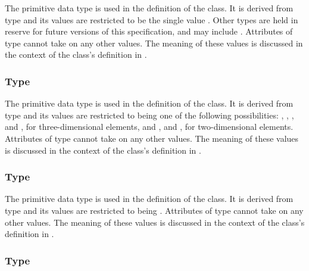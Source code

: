 The  primitive data type is used in the definition of the \ParametricObject class.  It is derived from type  and its values are restricted to be the single value .  Other  types are held in reserve for future versions of this specification, and may include . Attributes of type  cannot take on any other values.  The meaning of these values is discussed in the context of the \ParametricObject class's definition in .


\subsubsection{Type \fixttspace{}}
\label{primtype-PrimitiveKind}

The  primitive data type is used in the definition of the \CSGPrimitive class.  It is derived from type  and its values are restricted to being one of the following possibilities: , , , and , for three-dimensional \CSGObject elements, and , and , for two-dimensional \CSGObject elements.  Attributes of type  cannot take on any other values.  The meaning of these values is discussed in the context of the \CSGPrimitive class's definition in .


\subsubsection{Type \fixttspace{}}
\label{primtype-SetOperation}

The  primitive data type is used in the definition of the \CSGSetOperator class.  It is derived from type  and its values are restricted to being .  Attributes of type  cannot take on any other values.  The meaning of these values is discussed in the context of the \CSGSetOperator class's definition in .

\subsubsection{Type \fixttspace{}}
\label{primtype-doubleArray}

